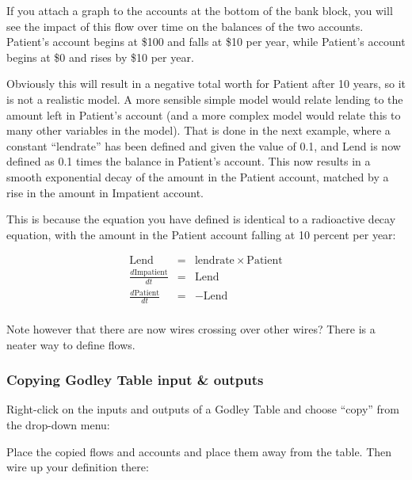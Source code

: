If you attach a graph to the accounts at the bottom of the bank block,
you will see the impact of this flow over time on the balances of the
two accounts. Patient's account begins at \$100 and falls at \$10 per
year, while Patient's account begins at \$0 and rises by \$10 per
year.



Obviously this will result in a negative total worth for Patient after
10 years, so it is not a realistic model. A more sensible simple model
would relate lending to the amount left in Patient's account (and a
more complex model would relate this to many other variables in the
model). That is done in the next example, where a constant ``lendrate''
has been defined and given the value of 0.1, and Lend is now defined
as 0.1 times the balance in Patient's account. This now results in a
smooth exponential decay of the amount in the Patient account, matched
by a rise in the amount in Impatient account.


This is because the equation you have defined is identical to a
radioactive decay equation, with the amount in the Patient account
falling at 10 percent per year:

\begin{eqnarray*}
\mathrm{Lend}&=&\mathrm{lendrate}\times\mathrm{Patient}\\
\frac{d\mathrm{Impatient}}{dt}&=&\mathrm{Lend}\\
\frac{d\mathrm{Patient}}{dt}&=&-\mathrm{Lend}\\
\end{eqnarray*}

Note however that there are now wires crossing over other wires? There
is a neater way to define flows. 

\subsubsection{Copying Godley Table input \& outputs}

Right-click on the inputs and outputs of a Godley Table and choose
``copy'' from the drop-down menu:

\begin{center}
\end{center}

Place the copied flows and accounts and place them away from the
table. Then wire up your definition there:

